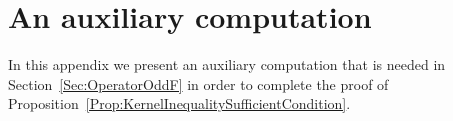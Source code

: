 \documentclass[12pt,reqno]{amsart}
\theoremstyle{definition}
\theoremstyle{remark}
\numberwithin{equation}{section}
\begin{document}
%
%
%


\section{An auxiliary computation}
\label{Sec:AuxiliaryResults2}

In this appendix we present an auxiliary computation that is needed in Section~\ref{Sec:OperatorOddF} in order to complete the proof of Proposition~\ref{Prop:KernelInequalitySufficientCondition}.
\end{document}
